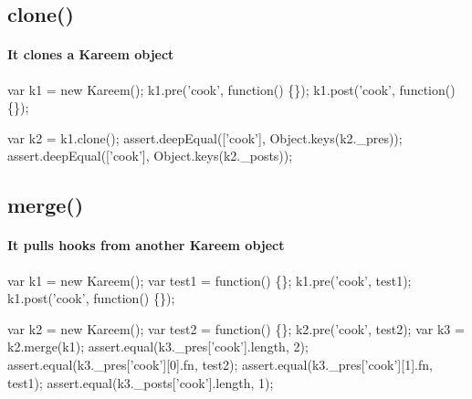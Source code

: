 \subsection*{clone()}

\paragraph*{It clones a Kareem object}


\begin{DoxyCode}
var k1 = new Kareem();
k1.pre('cook', function() \{\});
k1.post('cook', function() \{\});

var k2 = k1.clone();
assert.deepEqual(['cook'], Object.keys(k2.\_pres));
assert.deepEqual(['cook'], Object.keys(k2.\_posts));
\end{DoxyCode}


\subsection*{merge()}

\paragraph*{It pulls hooks from another Kareem object}


\begin{DoxyCode}
var k1 = new Kareem();
var test1 = function() \{\};
k1.pre('cook', test1);
k1.post('cook', function() \{\});

var k2 = new Kareem();
var test2 = function() \{\};
k2.pre('cook', test2);
var k3 = k2.merge(k1);
assert.equal(k3.\_pres['cook'].length, 2);
assert.equal(k3.\_pres['cook'][0].fn, test2);
assert.equal(k3.\_pres['cook'][1].fn, test1);
assert.equal(k3.\_posts['cook'].length, 1);
\end{DoxyCode}
 
